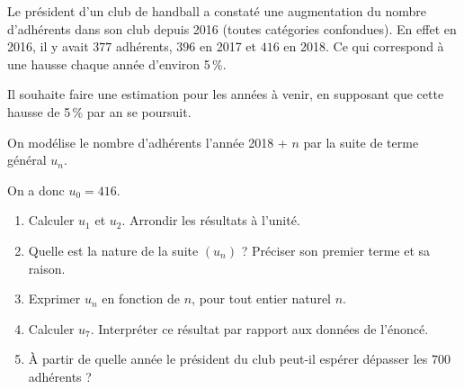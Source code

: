 \medskip

Le président d'un club de handball a constaté une augmentation du nombre d'adhérents dans
son club depuis 2016 (toutes catégories confondues). En effet en 2016, il y avait $377$ adhérents,
$396$ en 2017 et $416$ en 2018. Ce qui correspond à une hausse chaque année d'environ 5\,\%.

Il souhaite faire une estimation pour les années à venir, en supposant que cette hausse de 5\,\%
par an se poursuit.

On modélise le nombre d'adhérents l'année 2018 + $n$ par la suite de terme général $u_n$.

On a donc $u_0 = 416$.

\medskip

\begin{enumerate}
\item Calculer $u_1$ et $u_2$. Arrondir les résultats à l'unité.
\item Quelle est la nature de la suite $\left(u_n\right)$ ? Préciser son premier terme et sa raison.
\item Exprimer $u_n$ en fonction de $n$, pour tout entier naturel $n$.
\item Calculer $u_7$. Interpréter ce résultat par rapport aux données de l'énoncé.
\item À partir de quelle année le président du club peut-il espérer dépasser les $700$ adhérents ?
\end{enumerate}

\vspace{0,5cm}
